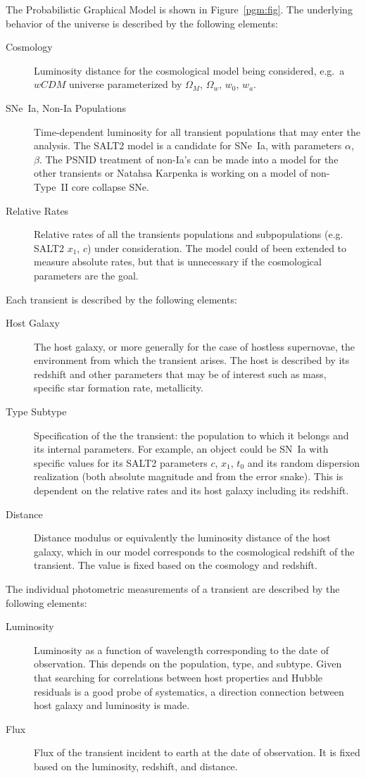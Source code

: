 \documentclass[preprint,3p]{elsarticle}
\begin{document}
The Probabilistic Graphical Model is shown in Figure~\ref{pgm:fig}. The underlying behavior of the universe is described by the following elements:
\begin{description}
\item [Cosmology] Luminosity distance for the cosmological model being considered,
e.g.\ a $wCDM$ universe parameterized by $\Omega_M$, $\Omega_w$, $w_0$, $w_a$.
\item[SNe~Ia, Non-Ia Populations] Time-dependent luminosity for all transient populations
that may enter
the analysis.  The SALT2 model is a candidate for SNe~Ia, with parameters $\alpha$, $\beta$.  The PSNID treatment of non-Ia's can be made into a model for the other
transients or Natahsa Karpenka is working on a model of non-Type~II core collapse SNe.
\item [Relative Rates] Relative rates of all the transients populations and
subpopulations (e.g. SALT2 $x_1$, $c$) under consideration.  The
model could of been extended to measure absolute rates, but that is unnecessary if
the cosmological parameters are the goal.
\end{description}
Each transient is described by the following elements:
\begin{description}
\item[Host Galaxy] The host galaxy, or more generally for the case of hostless supernovae,
the environment from which the transient arises.  The host is described by its redshift
and other parameters that may be of interest such as mass,
specific star formation rate, metallicity.
\item[Type Subtype] Specification of the the transient: the population to which it belongs
and its internal parameters.  For example, an object could be SN~Ia with specific
values for its SALT2 parameters $c$, $x_1$, $t_0$ and its random dispersion
realization (both absolute magnitude and from the error snake). 
This is dependent on the relative rates and
its host galaxy including its redshift.
\item[Distance] Distance modulus or equivalently the luminosity distance of the host galaxy,
which in our model corresponds to the cosmological redshift of the transient.  The value
is fixed based on the cosmology and redshift.
\end{description}
The individual photometric measurements of a transient are described by the following
elements:
\begin{description}
\item[Luminosity]  Luminosity as a function of wavelength
corresponding to the date of observation.   This depends on the population, type,
and subtype.  Given that searching for correlations between  host properties and Hubble
residuals is a good probe of systematics,
a direction connection between host galaxy and luminosity is made.
\item[Flux] Flux of the transient incident to earth at the date of observation.  It is 
fixed based on the luminosity, redshift, and distance.
\end{description}
\end{document}
